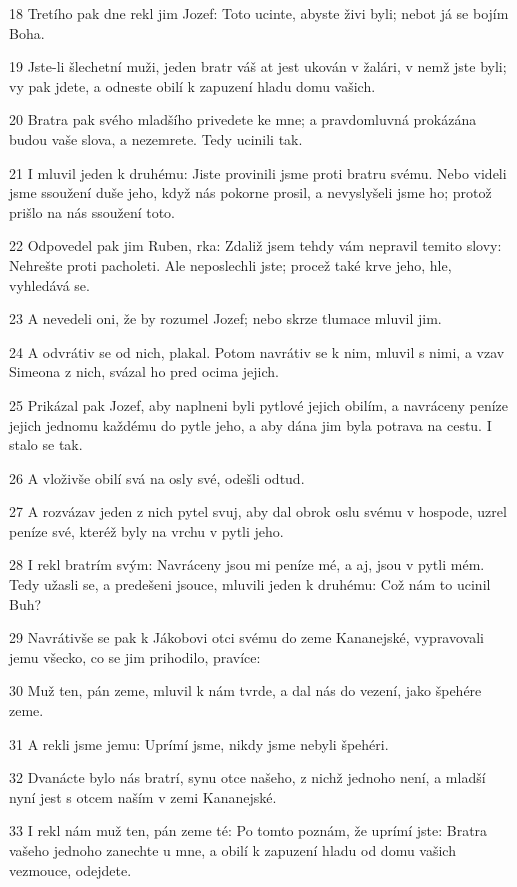 \par 18 Tretího pak dne rekl jim Jozef: Toto ucinte, abyste živi byli; nebot já se bojím Boha.
\par 19 Jste-li šlechetní muži, jeden bratr váš at jest ukován v žalári, v nemž jste byli; vy pak jdete, a odneste obilí k zapuzení hladu domu vašich.
\par 20 Bratra pak svého mladšího privedete ke mne; a pravdomluvná prokázána budou vaše slova, a nezemrete. Tedy ucinili tak.
\par 21 I mluvil jeden k druhému: Jiste provinili jsme proti bratru svému. Nebo videli jsme ssoužení duše jeho, když nás pokorne prosil, a nevyslyšeli jsme ho; protož prišlo na nás ssoužení toto.
\par 22 Odpovedel pak jim Ruben, rka: Zdaliž jsem tehdy vám nepravil temito slovy: Nehrešte proti pacholeti. Ale neposlechli jste; procež také krve jeho, hle, vyhledává se.
\par 23 A nevedeli oni, že by rozumel Jozef; nebo skrze tlumace mluvil jim.
\par 24 A odvrátiv se od nich, plakal. Potom navrátiv se k nim, mluvil s nimi, a vzav Simeona z nich, svázal ho pred ocima jejich.
\par 25 Prikázal pak Jozef, aby naplneni byli pytlové jejich obilím, a navráceny peníze jejich jednomu každému do pytle jeho, a aby dána jim byla potrava na cestu. I stalo se tak.
\par 26 A vloživše obilí svá na osly své, odešli odtud.
\par 27 A rozvázav jeden z nich pytel svuj, aby dal obrok oslu svému v hospode, uzrel peníze své, kteréž byly na vrchu v pytli jeho.
\par 28 I rekl bratrím svým: Navráceny jsou mi peníze mé, a aj, jsou v pytli mém. Tedy užasli se, a predešeni jsouce, mluvili jeden k druhému: Což nám to ucinil Buh?
\par 29 Navrátivše se pak k Jákobovi otci svému do zeme Kananejské, vypravovali jemu všecko, co se jim prihodilo, pravíce:
\par 30 Muž ten, pán zeme, mluvil k nám tvrde, a dal nás do vezení, jako špehére zeme.
\par 31 A rekli jsme jemu: Uprímí jsme, nikdy jsme nebyli špehéri.
\par 32 Dvanácte bylo nás bratrí, synu otce našeho, z nichž jednoho není, a mladší nyní jest s otcem naším v zemi Kananejské.
\par 33 I rekl nám muž ten, pán zeme té: Po tomto poznám, že uprímí jste: Bratra vašeho jednoho zanechte u mne, a obilí k zapuzení hladu od domu vašich vezmouce, odejdete.
